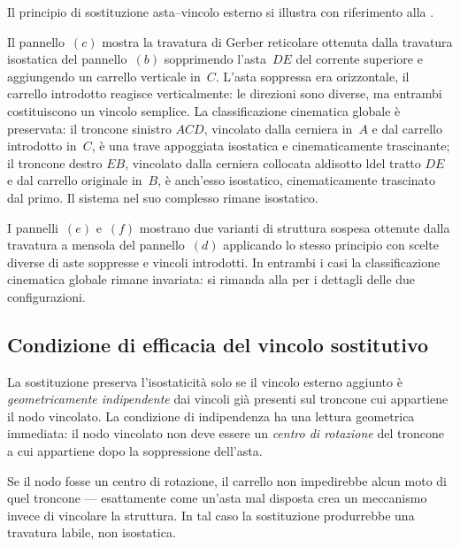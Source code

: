 \begin{esempio}
	Il principio di sostituzione asta--vincolo esterno
	si illustra con riferimento alla
	.
	
	Il pannello~$(c)$ mostra la travatura di Gerber
	reticolare ottenuta dalla travatura isostatica
	del pannello~$(b)$ sopprimendo l'asta~$DE$ del
	corrente superiore e aggiungendo un carrello
	verticale in~$C$. L'asta soppressa era orizzontale,
	il carrello introdotto reagisce verticalmente:
	le direzioni sono diverse, ma entrambi costituiscono
	un vincolo semplice. 
	La classificazione cinematica globale è preservata:
	il troncone sinistro  $ACD$, vincolato dalla cerniera in~$A$
	e dal carrello introdotto in~$C$, è
	una trave appoggiata isostatica e cinematicamente
	trascinante; il troncone destro $EB$, vincolato dalla
	cerniera collocata aldisotto ldel tratto $DE$ e dal carrello originale in~$B$, è
	anch'esso isostatico, cinematicamente trascinato
	dal primo. Il sistema nel suo complesso rimane
	isostatico.
	
	
	I pannelli~$(e)$ e~$(f)$ mostrano due varianti di
	struttura sospesa ottenute dalla travatura a mensola
	del pannello~$(d)$ applicando lo stesso principio
	con scelte diverse di aste soppresse e vincoli
	introdotti. In entrambi i casi la classificazione
	cinematica globale rimane invariata: si rimanda
	alla  per i dettagli
	delle due configurazioni.
\end{esempio}

\subsection{Condizione di efficacia del vincolo sostitutivo}
\label{subsec:efficacia_vincolo}

La sostituzione preserva l'isostaticità solo se il
vincolo esterno aggiunto è \emph{geometricamente
	indipendente} dai vincoli già presenti sul troncone
cui appartiene il nodo vincolato. La condizione di
indipendenza ha una lettura geometrica immediata:
il nodo vincolato non deve essere un \emph{centro
	di rotazione} del troncone a cui
appartiene dopo la soppressione dell'asta.

Se il nodo fosse un centro di rotazione,
il carrello non impedirebbe alcun moto di quel
troncone --- esattamente come un'asta mal disposta
crea un meccanismo invece di vincolare la struttura.
In tal caso la sostituzione produrrebbe una travatura
labile, non isostatica.


